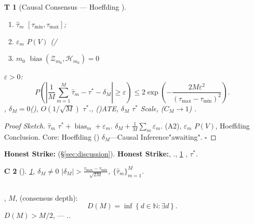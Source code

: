 \documentclass[11pt,a4paper,twoside]{article}
\newtheorem{theorem}Theorem[section]
\newtheorem{corollary}[theorem]Corollary
\DeclareMathOperator{\bias}{bias}
\begin{document}
\subsection{}
\begin{theorem}[Causal Consensus --- Hoeffding ]\label{thm:consensus}
\begin{enumerate}[label=(A\arabic*),leftmargin=*]
 \item $\hat{\tau}_m$ $[\tau_{\min}, \tau_{\max}]$; 
 \item $\varepsilon_m$ $P(V)$ (/
 \item $m_0$ 
 $\bias(\mathcal{Z}_{m_0}, \mathcal{H}_{m_0}) = 0$
\end{enumerate}
 $\varepsilon > 0$: 
\[
P\left(\left| \frac{1}{M}\sum_{m=1}^{M} \hat{\tau}_m - \tau^* - \delta_M \right|
 \geq \varepsilon \right)
\leq 2\exp\left(-\frac{2M\varepsilon^2}{(\tau_{\max} - \tau_{\min})^2} \right).
\]
, $\delta_M = 0$(), $O(1/\sqrt{M})$
 $\tau^*$., ()ATE, 
 $\delta_M$ $\tau^*$ Scale, ($C_M \to 1$)
.
\end{theorem}
\begin{proof}[Proof Sketch]
 $\hat{\tau}_m$ $\tau^* + \bias_m + \varepsilon_m$.
 $\delta_M + \frac{1}{M}\sum_m \varepsilon_m$.
 (A2), $\varepsilon_m$ $P(V)$, 
 Hoeffding Conclusion.
Core: Hoeffding ()
$\delta_M$---Causal Inference"awaiting". \hfill $\square$
\end{proof}
\begin{honestbox}
\textbf{Honest Strike:} 
(\S\ref{sec:discussion}).
\textbf{Honest Strike:}, 
., \ref{thm:consensus} , 
 $\tau^*$.
\end{honestbox}
\begin{corollary}[]
 \ref{thm:consensus}, $\delta_M \neq 0$ 
$|\delta_M| > \frac{\tau_{\max} - \tau_{\min}}{\sqrt{2M}}$, 
 $\{\hat{\tau}_m\}_{m=1}^{M}$.
\end{corollary}
\subsection{}
, $M$, (consensus depth): 
\[
D(M) = \inf\left\{ d \in \mathbb{N} : \exists \text{} d \text{} \right\}.
\]
 $D(M) > M/2$, ---
..
\section{}
\end{document}
